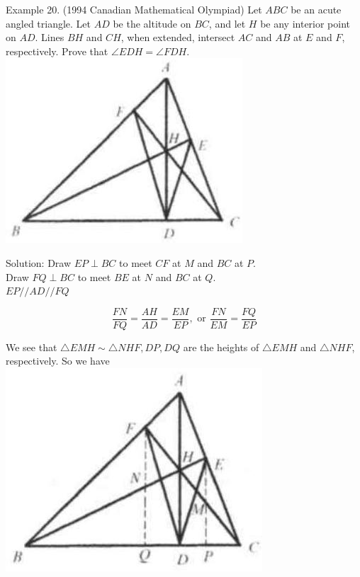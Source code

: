\documentclass[10pt]{article}
\begin{document}
Example 20. (1994 Canadian Mathematical Olympiad) Let \(A B C\) be an acute angled triangle. Let \(A D\) be the altitude on \(B C\), and let \(H\) be any interior point on \(A D\). Lines \(B H\) and \(C H\), when extended, intersect \(A C\) and \(A B\) at \(E\) and \(F\), respectively. Prove that \(\angle E D H=\angle F D H\).\\
\includegraphics[max width=\textwidth, center]{2025_04_17_97bc1f7e44d93c271a88g-087}

Solution:
Draw \(E P \perp B C\) to meet \(C F\) at \(M\) and \(B C\) at \(P\).\\
Draw \(F Q \perp B C\) to meet \(B E\) at \(N\) and \(B C\) at \(Q\).\\
\(E P / / A D / / F Q\)

\[
\frac{F N}{F Q}=\frac{A H}{A D}=\frac{E M}{E P}, \text { or } \frac{F N}{E M}=\frac{F Q}{E P}
\]

We see that \(\triangle E M H \sim \triangle N H F, D P, D Q\) are the heights of \(\triangle E M H\) and \(\triangle N H F\), respectively. So we have\\
\includegraphics[max width=\textwidth, center]{2025_04_17_97bc1f7e44d93c271a88g-087(1)}
\end{document}
